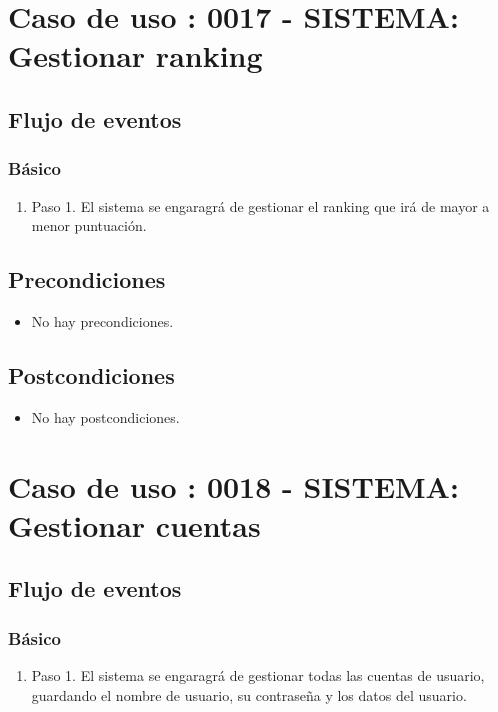 \section{Caso de uso : 0017 - SISTEMA: Gestionar ranking}\label{sec:uc0}
\subsection{Flujo de eventos}
\subsubsection{Básico}

\begin{enumerate}
\item Paso 1.
El sistema se engaragrá de gestionar el ranking que irá de mayor a menor puntuación.
\end{enumerate}

\subsection{Precondiciones}
\begin{itemize}
\item No hay precondiciones.
\end{itemize}

\subsection{Postcondiciones}
\begin{itemize}
\item No hay postcondiciones.
\end{itemize}



\section{Caso de uso : 0018 - SISTEMA: Gestionar cuentas}\label{sec:uc0}
\subsection{Flujo de eventos}
\subsubsection{Básico}

\begin{enumerate}
\item Paso 1.
El sistema se engaragrá de gestionar todas las cuentas de usuario, guardando el nombre de usuario, su contraseña y los datos del usuario.
\end{enumerate}

